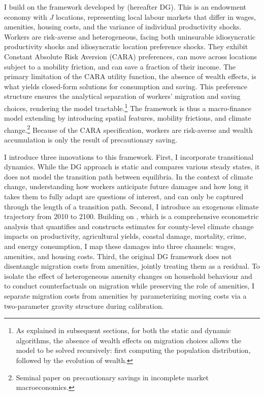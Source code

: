 \documentclass[12pt, a4paper]{article}
\begin{document}
I build on the framework developed by \citet{dvorkin_geography_2025} (hereafter DG). This is an endowment economy with $J$ locations, representing local labour markets that differ in wages, amenities, housing costs, and the variance of individual productivity shocks. Workers are risk-averse and heterogeneous, facing both uninsurable idiosyncratic productivity shocks and idiosyncratic location preference shocks. They exhibit Constant Absolute Risk Aversion (CARA) preferences, can move across locations subject to a mobility friction, and can save a fraction of their income. The primary limitation of the CARA utility function, the absence of wealth effects, is what yields closed-form solutions for consumption and saving. This preference structure ensures the analytical separation of workers' migration and saving choices, rendering the model tractable.\footnote{As explained in subsequent sections, for both the static and dynamic algorithms, the absence of wealth effects on migration choices allows the model to be solved recursively: first computing the population distribution, followed by the evolution of wealth.} The framework is thus a macro-finance model extending \citet{caballero_consumption_1990} by introducing spatial features, mobility frictions, and climate change.\footnote{Seminal paper on precautionary savings in incomplete market macroeconomics.} Because of the CARA specification, workers are risk-averse and wealth accumulation is only the result of precautionary saving.

I introduce three innovations to this framework. First, I incorporate transitional dynamics. While the DG approach is static and compares various steady states, it does not model the transition path between equilibria. In the context of climate change, understanding how workers anticipate future damages and how long it takes them to fully adapt are questions of interest, and can only be captured through the length of a transition path. Second, I introduce an exogenous climate trajectory from 2010 to 2100. Building on \citet{hsiang_estimating_2017}, which is a comprehensive econometric analysis that quantifies and constructs estimates for county-level climate change impacts on productivity, agricultural yields, coastal damage, mortality, crime, and energy consumption, I map these damages into three channels: wages, amenities, and housing costs. Third, the original DG framework does not disentangle migration costs from amenities, jointly treating them as a residual. To isolate the effect of heterogeneous amenity changes on household behaviour and to conduct counterfactuals on migration while preserving the role of amenities, I separate migration costs from amenities by parameterizing moving costs via a two-parameter gravity structure during calibration.
\end{document}
